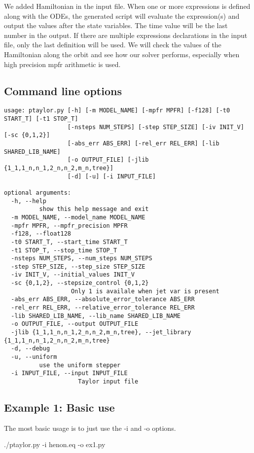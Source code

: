 \documentclass[10pt]{article}
\theoremstyle{remark}
\begin{document}
We added Hamiltonian in the input file. When one or more expressions
is defined along with the ODEs, the generated script will evaluate the
expression(s) and output the values after the state variables. The
time value will be the last number in the output. If there are
multiple expressions declarations in the input file, only the last
definition will be used. We will check the values of the Hamiltonian
along the orbit and see how our solver performs, especially when high
precision mpfr arithmetic is used.

\subsection{Command line options}
\begin{verbatim}
usage: ptaylor.py [-h] [-m MODEL_NAME] [-mpfr MPFR] [-f128] [-t0 START_T] [-t1 STOP_T] 
                  [-nsteps NUM_STEPS] [-step STEP_SIZE] [-iv INIT_V] [-sc {0,1,2}] 
                  [-abs_err ABS_ERR] [-rel_err REL_ERR] [-lib SHARED_LIB_NAME] 
                  [-o OUTPUT_FILE] [-jlib {1_1,1_n,n_1,2_n,n_2,m_n,tree}] 
                  [-d] [-u] [-i INPUT_FILE]

optional arguments:
  -h, --help            
          show this help message and exit
  -m MODEL_NAME, --model_name MODEL_NAME
  -mpfr MPFR, --mpfr_precision MPFR
  -f128, --float128
  -t0 START_T, --start_time START_T
  -t1 STOP_T, --stop_time STOP_T
  -nsteps NUM_STEPS, --num_steps NUM_STEPS
  -step STEP_SIZE, --step_size STEP_SIZE
  -iv INIT_V, --initial_values INIT_V
  -sc {0,1,2}, --stepsize_control {0,1,2}
                   Only 1 is availale when jet var is present
  -abs_err ABS_ERR, --absolute_error_tolerance ABS_ERR
  -rel_err REL_ERR, --relative_error_tolerance REL_ERR
  -lib SHARED_LIB_NAME, --lib_name SHARED_LIB_NAME
  -o OUTPUT_FILE, --output OUTPUT_FILE
  -jlib {1_1,1_n,n_1,2_n,n_2,m_n,tree}, --jet_library {1_1,1_n,n_1,2_n,n_2,m_n,tree}
  -d, --debug
  -u, --uniform
          use the uniform stepper
  -i INPUT_FILE, --input INPUT_FILE
                     Taylor input file
\end{verbatim}

\subsection{Example 1: Basic use}

The most basic usage is to just use the -i and -o options.
\begin{command}
  ./ptaylor.py -i henon.eq -o ex1.py
\end{command}
\end{document}
